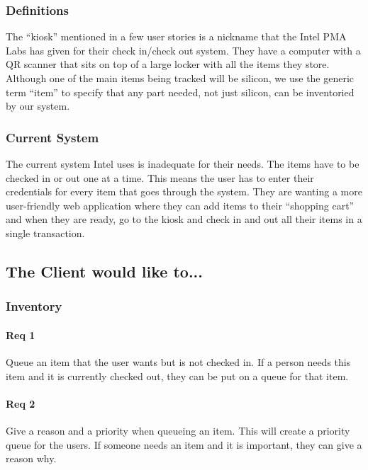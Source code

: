 \documentclass[10pt, onecolumn, twoside, peerreview]{IEEEtran}
\begin{document}
\subsubsection{Definitions}
The “kiosk” mentioned in a few user stories is a nickname that the Intel PMA Labs has given for their check in/check
out system. They have a computer with a QR scanner that sits on top of a large locker with all the items they store.\\

Although one of the main items being tracked will be silicon, we use the generic term “item” to specify that any part
needed, not just silicon, can be inventoried by our system.\\

\subsubsection{Current System}
The current system Intel uses is inadequate for their needs. The items have to be checked in or out one at a time. This
means the user has to enter their credentials for every item that goes through the system. They are wanting a more
user-friendly web application where they can add items to their “shopping cart” and when they are ready, go to the
kiosk and check in and out all their items in a single transaction.\\

\subsection{The Client would like to...}

\subsubsection{Inventory}
\paragraph*{Req 1} Queue an item that the user wants but is not checked in. If a person needs this item and it is currently checked out,
they can be put on a queue for that item.\\

\paragraph*{Req 2} Give a reason and a priority when queueing an item. This will create a priority queue for the users. If someone needs
an item and it is important, they can give a reason why.\\
\end{document}
